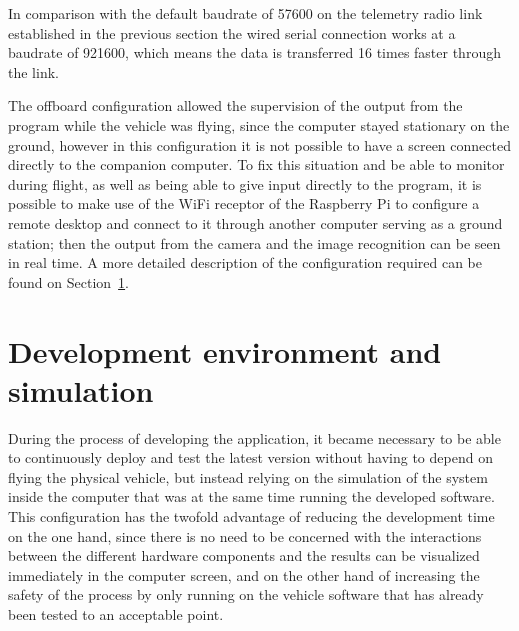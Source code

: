In comparison with the default baudrate of 57600 on the telemetry radio link established in the previous section the wired serial connection works at a baudrate of 921600, which means the data is transferred 16 times faster through the link.

The offboard configuration allowed the supervision of the output from the program while the vehicle was flying, since the computer stayed stationary on the ground, however in this configuration it is not possible to have a screen connected directly to the companion computer.
To fix this situation and be able to monitor during flight, as well as being able to give input directly to the program, it is possible to make use of the WiFi receptor of the Raspberry Pi to configure a remote desktop and connect to it through another computer serving as a ground station;
then the output from the camera and the image recognition can be seen in real time.
A more detailed description of the configuration required can be found on Section~\ref{sec:devenv}.

\section{Development environment and simulation}
\label{sec:devenv}
During the process of developing the application, it became necessary to be able to continuously deploy and test the latest version without having to depend on flying the physical vehicle, but instead relying on the simulation of the system inside the computer that was at the same time running the developed software.
This configuration has the twofold advantage of reducing the development time on the one hand, since there is no need to be concerned with the interactions between the different hardware components and the results can be visualized immediately in the computer screen, and on the other hand of increasing the safety of the process by only running on the vehicle software that has already been tested to an acceptable point.

